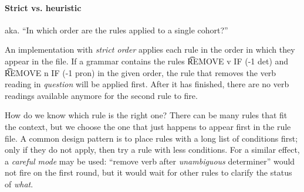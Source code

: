\begin{table}[h!]
\centering
{}
  \caption{Combinations of rule ordering and execution strategy.}
  \label{table:nelikentta}
\end{table}

\paragraph{Strict vs. heuristic}

aka. ``In which order are the rules applied to a single cohort?''

An implementation with \emph{strict order} applies each rule in the
order in which they appear in the file. If a grammar contains the
rules \t{REMOVE v IF (-1 det)} and \t{REMOVE n IF (-1 pron)} in the
given order, the rule that removes the verb reading in \emph{question}
will be applied first. After it has finished, there are no verb
readings available anymore for the second rule to fire.
					
How do we know which rule is the right one? There can be many rules
that fit the context, but we choose the one that just happens to
appear first in the rule file.  A common design pattern is to place
rules with a long list of conditions first; only if they do not apply,
then try a rule with less conditions. For a similar effect, a
\emph{careful mode} may be used: ``remove verb after
\emph{unambiguous} determiner'' would not fire on the first round, but
it would wait for other rules to clarify the status of \emph{what}.
					
